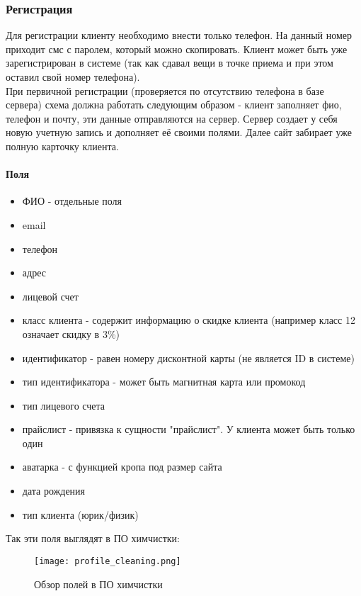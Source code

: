 \documentclass[DIV=calc, paper=a4, fontsize=11pt]{scrartcl} %
\begin{document}
\subsubsection{Регистрация}
Для регистрации клиенту необходимо внести только телефон. На данный номер приходит смс с паролем, который можно скопировать. Клиент может быть уже зарегистрирован в системе (так как сдавал вещи в точке приема и при этом оставил свой номер телефона).
\\[0.5cm]
При первичной регистрации (проверяется по отсутствию телефона в базе сервера) схема должна работать следующим образом - клиент заполняет фио, телефон и почту, эти данные отправляются на сервер. Сервер создает у себя новую учетную запись и дополняет её своими полями. Далее сайт забирает уже полную карточку клиента.

\paragraph{Поля}
\begin{itemize}
	\item ФИО - отдельные поля
	\item email
	\item телефон
	\item адрес
	\item лицевой счет
	\item класс клиента - содержит информацию о скидке клиента (например класс 12 означает скидку в 3\%)
	\item идентификатор - равен номеру дисконтной карты (не является ID в системе)
	\item тип идентификатора - может быть магнитная карта или промокод
	\item тип лицевого счета
	\item прайслист - привязка к сущности "прайслист". У клиента может быть только один
	\item аватарка - с функцией кропа под размер сайта
	\item дата рождения
	\item тип клиента (юрик/физик)
\end{itemize}

Так эти поля выглядят в ПО химчистки:

	\begin{figure}[H]
        \centering
        \texttt{[image: profile\_cleaning.png]}
        \caption{Обзор полей в ПО химчистки\label{fig:profile_cleaning.png}}
    \end{figure}
    
\end{document}

